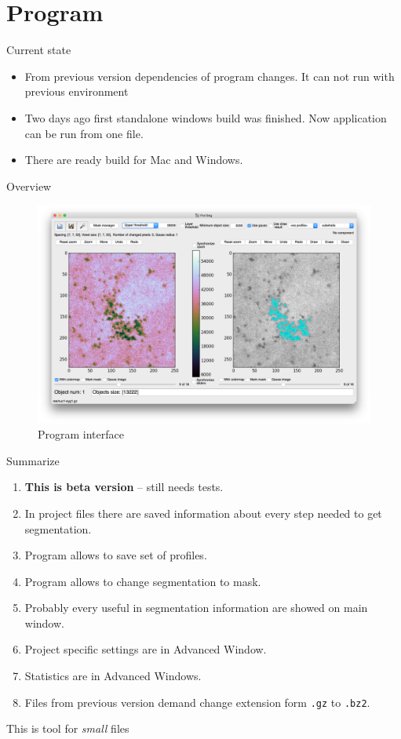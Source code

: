 \documentclass[10pt,usenames,dvipsnames]{beamer}
\begin{document}
\section{Program}
\begin{frame}[c]{Current state}
\begin{itemize}
  \item From previous version dependencies of program changes. 
    It can not run with previous environment
  \item Two days ago first standalone windows build was finished. Now application can be run from one file.
  \item There are ready build for Mac and Windows. 
\end{itemize}
\end{frame}
\begin{frame}[c]{Overview}
  \begin{figure}[htpb]
    \centering
    \includegraphics[width=1\linewidth]{interface}
    \caption{Program interface}
    \label{fig:name}
  \end{figure}
\end{frame}
\begin{frame}[c]{Summarize}
  \begin{enumerate}
    \item \textbf{This is beta version} – still needs tests.
    \item In project files there are saved information about every step needed to get segmentation. 
    \item Program allows to save set of profiles.
    \item Program allows to change segmentation to mask. 
    \item Probably every useful in segmentation information are showed on main window.
    \item Project specific settings are in Advanced Window.
    \item Statistics are in Advanced Windows.
    \item Files from previous version demand change extension form \texttt{.gz} to \texttt{.bz2}.
  \end{enumerate}  
\end{frame}
\begin{frame}[standout]{}
  This is tool for \emph{small} files  
\end{frame}
\end{document}
